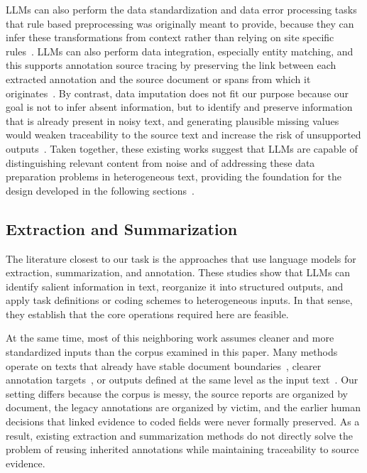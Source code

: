\documentclass{article}
\begin{document}
LLMs can also perform the data standardization and data error processing tasks that rule based preprocessing was originally meant to provide, because they can infer these transformations from context rather than relying on site specific rules~\cite{Ma_etal2023,Zhang_etal2024,Choi_etal2024,Biester_etal2024,Li_etal2024,Yan_etal2024}. LLMs can also perform data integration, especially entity matching, and this supports annotation source tracing by preserving the link between each extracted annotation and the source document or spans from which it originates~\cite{Peeters_etal2025,Wang_etal2025,Fan_etal2024}. By contrast, data imputation does not fit our purpose because our goal is not to infer absent information, but to identify and preserve information that is already present in noisy text, and generating plausible missing values would weaken traceability to the source text and increase the risk of unsupported outputs~\cite{Ding_etal2024,He_etal2025}. Taken together, these existing works suggest that LLMs are capable of distinguishing relevant content from noise and of addressing these data preparation problems in heterogeneous text, providing the foundation for the design developed in the following sections~\cite{Zhou_etal2026}.

\subsection{Extraction and
Summarization}\label{extraction-and-summarization}

The literature closest to our task is the approaches that use language models for extraction, summarization, and annotation. These studies show that LLMs can identify salient information in text, reorganize it into structured outputs, and apply task definitions or coding schemes to heterogeneous inputs. In that sense, they establish that the core operations required here are feasible.

At the same time, most of this neighboring work assumes cleaner and more standardized inputs than the corpus examined in this paper. Many methods operate on texts that already have stable document boundaries~\cite{Choi_etal2024}, clearer annotation targets~\cite{Ma_etal2023}, or outputs defined at the same level as the input text~\cite{Zhang_etal2024}. Our setting differs because the corpus is messy, the source reports are organized by document, the legacy annotations are organized by victim, and the earlier human decisions that linked evidence to coded fields were never formally preserved. As a result, existing extraction and summarization methods do not directly solve the problem of reusing inherited annotations while maintaining traceability to source evidence.
\end{document}
